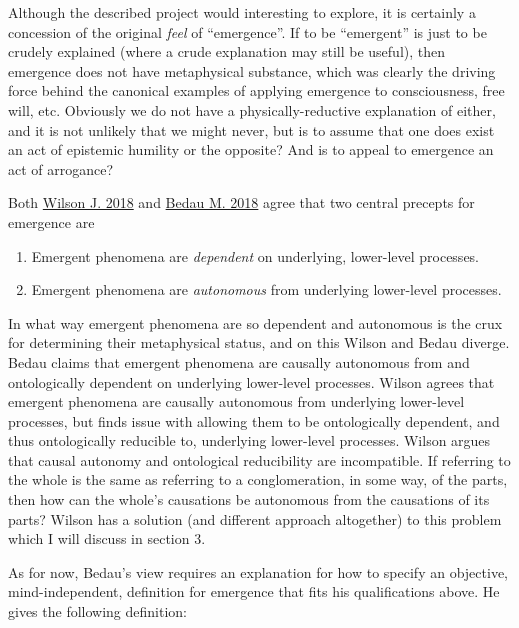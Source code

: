 \documentclass{article}
\newcommand{\ti}[1]{\textit{#1}}
\renewcommand{\cite}[1]{\hyperlink{#1}{#1}}
\begin{document}

Although the described project would interesting to explore, it is certainly a concession of the original \ti{feel} of ``emergence''. If to be ``emergent'' is just to be crudely explained (where a crude explanation may still be useful), then emergence does not have metaphysical substance, which was clearly the driving force behind the canonical examples of applying emergence to consciousness, free will, etc. Obviously we do not have a physically-reductive explanation of either, and it is not unlikely that we might never, but is to assume that one does exist an act of epistemic humility or the opposite? And is to appeal to emergence an act of arrogance?

Both \cite{Wilson J. 2018} and \cite{Bedau M. 2018} agree that two central precepts for emergence are

\begin{enumerate}
\item Emergent phenomena are \ti{dependent} on underlying, lower-level processes.
\item Emergent phenomena are \ti{autonomous} from underlying lower-level processes.
\end{enumerate}

In what way emergent phenomena are so dependent and autonomous is the crux for determining their metaphysical status, and on this Wilson and Bedau diverge. Bedau claims that emergent phenomena are causally autonomous from and ontologically dependent on underlying lower-level processes. Wilson agrees that emergent phenomena are causally autonomous from underlying lower-level processes, but finds issue with allowing them to be ontologically dependent, and thus ontologically reducible to, underlying lower-level processes. Wilson argues that causal autonomy and ontological reducibility are incompatible. If referring to the whole is the same as referring to a conglomeration, in some way, of the parts, then how can the whole's causations be autonomous from the causations of its parts? Wilson has a solution (and different approach altogether) to this problem which I will discuss in section 3.

As for now, Bedau's view requires an explanation for how to specify an objective, mind-independent, definition for emergence that fits his qualifications above. He gives the following definition:
\end{document}

